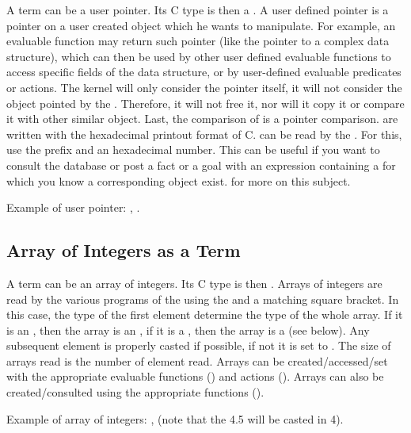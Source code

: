 A term can be a user pointer. Its C type is then a . A user
defined pointer is a pointer on a user created object which he wants to
manipulate. For example, an evaluable function may return such pointer (like
the pointer to a complex data structure), which can then be used by other user
defined evaluable functions to access specific fields of the data structure, or
by user-defined evaluable predicates or actions. The kernel will only consider
the pointer itself, it will not consider the object pointed by the
.  Therefore, it will not free it, nor will it copy it or
compare it with other similar object. Last, the comparison of 
is a pointer comparison.   are written with the hexadecimal
printout format of C.  can be read by the \CXPK{}. For this,
use the  prefix and an hexadecimal number.  This can be useful if you
want to consult the database or post a fact or a goal with an expression
containing a  for which you know a corresponding object
exist.  for more on this subject.

Example of user pointer: , .

\subsection{Array of Integers as a Term}

A term can be an array of integers. Its C type is then . Arrays
of integers are read by the various programs of the \COPRSDE{} using the
\samp{[} and a matching \samp{]} square bracket. In this case, the type of the
first element determine the type of the whole array. If it is an
, then the array is an , if it is a ,
then the array is a  (see below).  Any subsequent element is
properly casted if possible, if not it is set to . The size of arrays
read is the number of element read. Arrays can be created/accessed/set with the
appropriate evaluable functions () and actions (). Arrays can also
be created/consulted using the appropriate functions ().

Example of array of integers: \code{[ 1 2 4 5 0 3 4]}, \code{[1 3 4.5 5 7]}
(note that the 4.5 will be casted in 4).

